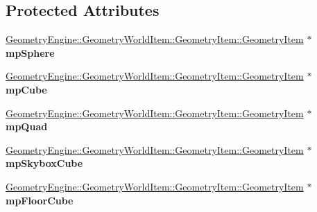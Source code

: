 \subsection*{Protected Attributes}
\begin{DoxyCompactItemize}
\item 
\mbox{\label{class_unit_test_1_1_c_multi_viewport_scene_test_a6770072457f00895e4a9eb3a657c9119}} 
\mbox{\hyperlink{class_geometry_engine_1_1_geometry_world_item_1_1_geometry_item_1_1_geometry_item}{Geometry\+Engine\+::\+Geometry\+World\+Item\+::\+Geometry\+Item\+::\+Geometry\+Item}} $\ast$ {\bfseries mp\+Sphere}
\item 
\mbox{\label{class_unit_test_1_1_c_multi_viewport_scene_test_a27d3e760eb69666ca57079b5c18cabdc}} 
\mbox{\hyperlink{class_geometry_engine_1_1_geometry_world_item_1_1_geometry_item_1_1_geometry_item}{Geometry\+Engine\+::\+Geometry\+World\+Item\+::\+Geometry\+Item\+::\+Geometry\+Item}} $\ast$ {\bfseries mp\+Cube}
\item 
\mbox{\label{class_unit_test_1_1_c_multi_viewport_scene_test_a6bba5bfbd216cc053440b954c6ce1e9d}} 
\mbox{\hyperlink{class_geometry_engine_1_1_geometry_world_item_1_1_geometry_item_1_1_geometry_item}{Geometry\+Engine\+::\+Geometry\+World\+Item\+::\+Geometry\+Item\+::\+Geometry\+Item}} $\ast$ {\bfseries mp\+Quad}
\item 
\mbox{\label{class_unit_test_1_1_c_multi_viewport_scene_test_a3a15b7c740ee31043db0eead2841c84f}} 
\mbox{\hyperlink{class_geometry_engine_1_1_geometry_world_item_1_1_geometry_item_1_1_geometry_item}{Geometry\+Engine\+::\+Geometry\+World\+Item\+::\+Geometry\+Item\+::\+Geometry\+Item}} $\ast$ {\bfseries mp\+Skybox\+Cube}
\item 
\mbox{\label{class_unit_test_1_1_c_multi_viewport_scene_test_ac5f2c71845bba71b8e89277ffd777ac3}} 
\mbox{\hyperlink{class_geometry_engine_1_1_geometry_world_item_1_1_geometry_item_1_1_geometry_item}{Geometry\+Engine\+::\+Geometry\+World\+Item\+::\+Geometry\+Item\+::\+Geometry\+Item}} $\ast$ {\bfseries mp\+Floor\+Cube}
\item 
\mbox{\label{class_unit_test_1_1_c_multi_viewport_scene_test_ad39dd8ae84491d6ef11413b33205a865}} 

\end{DoxyCompactItemize}
